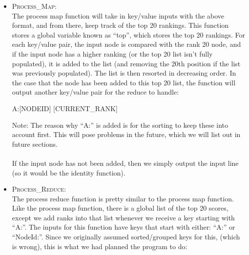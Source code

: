 \documentclass{article}
\begin{document}
\begin{itemize}
        After retrieving the adjacency matrix and setting the current rank to be the aggregated rankings for a particular NodeId, the PageRank reduce function will output a key/value pair in the following format:
        \begin{center}
          NodeId:[NODEID] \hspace{4mm} [ITERATION],[CURRENT\_RANK],[PREVIOUS\_RANK],[ADJACENCY\_LIST]
        \end{center}
        This output will then be passed into the \textsc{Process\_Map} function.
        \vspace{5mm}
        \item \textsc{Process\_Map}: \\
        The process map function will take in key/value inputs with the above format, and from there, keep track of the top 20 rankings. This function stores a global variable known as ``top'', which stores the top 20 rankings. For each key/value pair, the input node is compared with the rank 20 node, and if the input node has a higher ranking (or the top 20 list isn't fully populated), it is added to the list (and removing the 20th position if the list was previously populated). The list is then resorted in decreasing order. In the case that the node has been added to this top 20 list, the function will output another key/value pair for the reduce to handle:
        \begin{center}
        A:[NODEID] \hspace{8mm} [CURRENT\_RANK]
        \end{center}
        Note: The reason why ``A:'' is added is for the sorting to keep these into account first. This will pose problems in the future, which we will list out in future sections. 
        \\ \\
        \noindent If the input node has not been added, then we simply output the input line (so it would be the identity function).
        \vspace{5mm}
        \item \textsc{Process\_Reduce}: \\
        The process reduce function is pretty similar to the process map function. Like the process map function, there is a global list of the top 20 scores, except we add ranks into that list whenever we receive a key starting with ``A:''. The inputs for this function have keys that start with either: ``A:'' or ``NodeId:''. Since we originally assumed sorted/grouped keys for this, (which is wrong), this is what we had planned the program to do:

\end{itemize}
\end{document}
